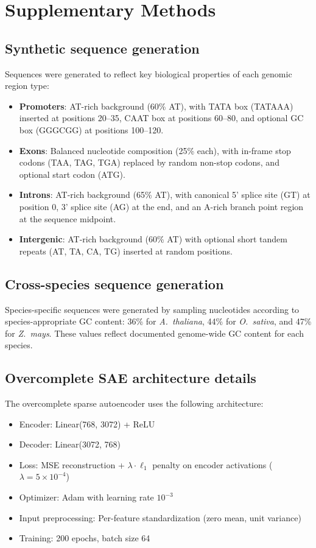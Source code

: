 \documentclass[12pt]{article}
\begin{document}
\section*{Supplementary Methods}

\subsection*{Synthetic sequence generation}

Sequences were generated to reflect key biological properties of each genomic region type:

\begin{itemize}
    \item \textbf{Promoters}: AT-rich background (60\% AT), with TATA box (TATAAA) inserted at positions 20--35, CAAT box at positions 60--80, and optional GC box (GGGCGG) at positions 100--120.
    \item \textbf{Exons}: Balanced nucleotide composition (25\% each), with in-frame stop codons (TAA, TAG, TGA) replaced by random non-stop codons, and optional start codon (ATG).
    \item \textbf{Introns}: AT-rich background (65\% AT), with canonical 5' splice site (GT) at position 0, 3' splice site (AG) at the end, and an A-rich branch point region at the sequence midpoint.
    \item \textbf{Intergenic}: AT-rich background (60\% AT) with optional short tandem repeats (AT, TA, CA, TG) inserted at random positions.
\end{itemize}

\subsection*{Cross-species sequence generation}

Species-specific sequences were generated by sampling nucleotides according to species-appropriate GC content: 36\% for \textit{A.\ thaliana}, 44\% for \textit{O.\ sativa}, and 47\% for \textit{Z.\ mays}. These values reflect documented genome-wide GC content for each species.

\subsection*{Overcomplete SAE architecture details}

The overcomplete sparse autoencoder uses the following architecture:
\begin{itemize}
    \item Encoder: Linear(768, 3072) + ReLU
    \item Decoder: Linear(3072, 768)
    \item Loss: MSE reconstruction + $\lambda \cdot \ell_1$ penalty on encoder activations ($\lambda = 5 \times 10^{-4}$)
    \item Optimizer: Adam with learning rate $10^{-3}$
    \item Input preprocessing: Per-feature standardization (zero mean, unit variance)
    \item Training: 200 epochs, batch size 64
\end{itemize}
\end{document}
